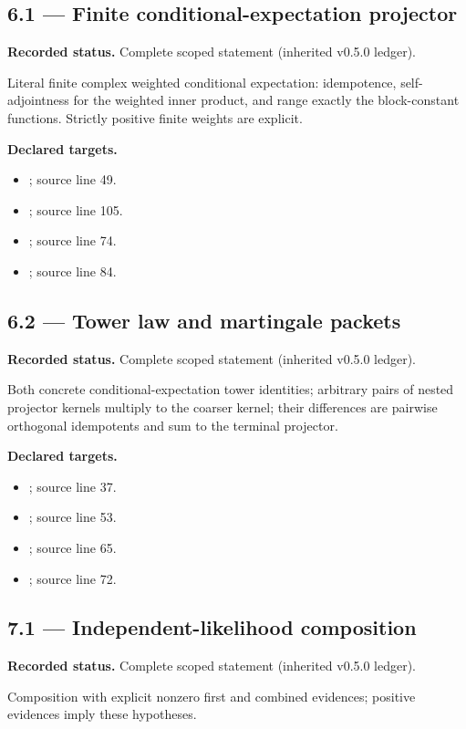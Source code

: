 \subsection{6.1 — Finite conditional-expectation projector}
\label{result:6.1}
\textbf{Recorded status.} Complete scoped statement (inherited v0.5.0 ledger).\par
Literal finite complex weighted conditional expectation: idempotence, self-adjointness for the weighted inner product, and range exactly the block-constant functions. Strictly positive finite weights are explicit.

\textbf{Declared targets.}\begin{itemize}
\item {}; source line 49.
\item {}; source line 105.
\item {}; source line 74.
\item {}; source line 84.
\end{itemize}
\subsection{6.2 — Tower law and martingale packets}
\label{result:6.2}
\textbf{Recorded status.} Complete scoped statement (inherited v0.5.0 ledger).\par
Both concrete conditional-expectation tower identities; arbitrary pairs of nested projector kernels multiply to the coarser kernel; their differences are pairwise orthogonal idempotents and sum to the terminal projector.

\textbf{Declared targets.}\begin{itemize}
\item {}; source line 37.
\item {}; source line 53.
\item {}; source line 65.
\item {}; source line 72.
\end{itemize}
\subsection{7.1 — Independent-likelihood composition}
\label{result:7.1}
\textbf{Recorded status.} Complete scoped statement (inherited v0.5.0 ledger).\par
Composition with explicit nonzero first and combined evidences; positive evidences imply these hypotheses.

